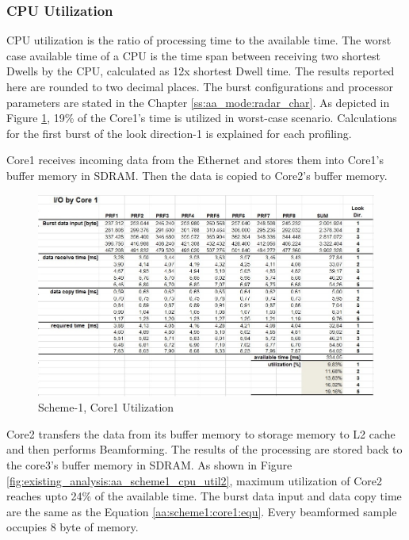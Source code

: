 \subsubsection{CPU Utilization}
\label{sss:scheme1:aa:cpu_util}
CPU utilization is the ratio of processing time to the available time. The worst case available time of a CPU is the time span between receiving two shortest Dwells by the CPU, calculated as 12x shortest Dwell time. The results reported here are rounded to two decimal places. The burst configurations and processor parameters are stated in the Chapter \ref{ss:aa_mode:radar_char}. As depicted in Figure \ref{fig:existing_analysis:aa_scheme1_cpu_util1}, 19\% of the Core1's time is utilized in worst-case scenario. Calculations for the first burst of the look direction-1 is explained for each profiling.

Core1 receives incoming data from the Ethernet and stores them into Core1's buffer memory in SDRAM. Then the data is copied to Core2's buffer memory.

\begin{figure}[h!]
	\centering
	\includegraphics[width=150mm]{figures/aa_scheme1_cpu_util_1}
	\caption{Scheme-1, Core1 Utilization}
	\label{fig:existing_analysis:aa_scheme1_cpu_util1}
\end{figure}

Core2 transfers the data from its buffer memory to storage memory to L2 cache and then performs Beamforming. The results of the processing are stored back to the core3's buffer memory in SDRAM. As shown in Figure \ref{fig:existing_analysis:aa_scheme1_cpu_util2}, maximum utilization of Core2 reaches upto 24\% of the available time. The burst data input and data copy time are the same as the Equation \ref{aa:scheme1:core1:equ}. Every beamformed sample occupies 8 byte of memory.


